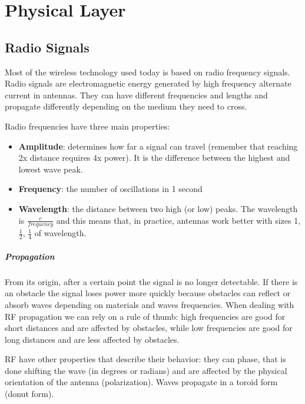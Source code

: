 \chapter{Physical Layer}

\section{Radio Signals}
Most of the wireless technology used today is based on radio frequency 
signals. 
Radio signals are electromagnetic energy generated by high frequency 
alternate current in antennas. They can have different frequencies and lengths 
and propagate differently depending on the medium they need to cross.

Radio frequencies have three main properties:
\begin{itemize}
\item \textbf{Amplitude}: determines how far a signal can 
  travel (remember that reaching 2x distance requires 4x power). It is the 
  difference between the highest and lowest wave peak.
\item \textbf{Frequency}: the number of oscillations in 1 second
\item \textbf{Wavelength}: the distance between two high (or low) peaks. The
  wavelength is $\frac{c}{frequency}$ and this means that, in practice, antennas
  work better with sizes 1, $\frac{1}{2}$, $\frac{1}{4}$ of wavelength.
\end{itemize}

\paragraph*{Propagation} From its origin, after a certain point the 
signal is no longer detectable. If there is an obstacle the signal loses power 
more quickly because obstacles can reflect or absorb waves depending on 
materials and waves frequencies.
When dealing with RF propagation we can rely on a rule of thumb: high 
frequencies are good for short distances and are affected by obstacles, while 
low frequencies are good for long distances and are less affected by obstacles.

RF have other properties that describe their behavior: they can phase, 
that is done shifting the wave (in degrees or radians) and are affected by the
physical orientation of the antenna (polarization).
Waves propagate in a toroid form (donut form).


